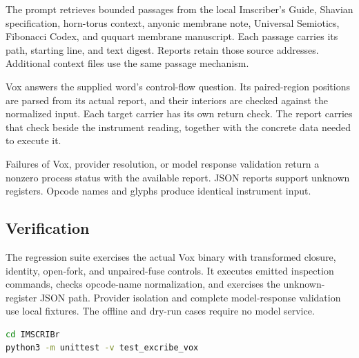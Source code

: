 \documentclass[12pt,a4paper]{article}
\begin{document}
The prompt retrieves bounded passages from the local Imscriber's Guide, Shavian specification, horn-torus context, anyonic membrane note, Universal Semiotics, Fibonacci Codex, and ququart membrane manuscript. Each passage carries its path, starting line, and text digest. Reports retain those source addresses. Additional context files use the same passage mechanism.

Vox answers the supplied word's control-flow question. Its paired-region positions are parsed from its actual report, and their interiors are checked against the normalized input. Each target carrier has its own return check. The report carries that check beside the instrument reading, together with the concrete data needed to execute it.

Failures of Vox, provider resolution, or model response validation return a nonzero process status with the available report. JSON reports support unknown registers. Opcode names and glyphs produce identical instrument input.

\subsection{Verification}

The regression suite exercises the actual Vox binary with transformed closure, identity, open-fork, and unpaired-fuse controls. It executes emitted inspection commands, checks opcode-name normalization, and exercises the unknown-register JSON path. Provider isolation and complete model-response validation use local fixtures. The offline and dry-run cases require no model service.

\begin{lstlisting}[language=bash]
cd IMSCRIBr
python3 -m unittest -v test_excribe_vox
\end{lstlisting}
\end{document}
